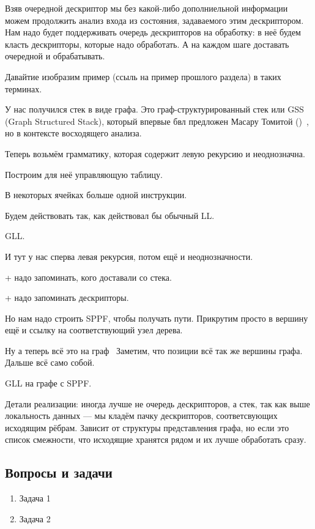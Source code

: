 Взяв очередной дескриптор мы без какой-либо дополниельной информации можем продолжить анализ входа из состояния, задаваемого этим дескриптором.
Нам надо будет поддерживать очередь дескрипторов на обработку: в неё будем класть дескрипторы, которые надо обработать. А на каждом шаге доставать очередной и обрабатывать.

Давайтие изобразим пример (ссыль на пример прошлого раздела) в таких терминах.
\begin{example}
\end{example}

У нас получился стек в виде графа. Это граф-структурированный стек или GSS (Graph Structured Stack), который впервые бвл предложен Масару Томитой ()~\cite{!!!}, но в контексте восходящего анализа.



Теперь возьмём грамматику, которая содержит левую рекурсию и неоднозначна.

Построим для неё управляющую таблицу.


В некоторых ячейках больше одной инструкции.

Будем действовать так, как действовал бы обычный LL.

\begin{example} GLL.

  И тут у нас сперва левая рекурсия, потом ещё и неоднозначности.

  + надо запоминать, кого доставали со стека.

  + надо запоминать дескрипторы.

\end{example}


Но нам надо строить SPPF, чтобы получать пути.
Прикрутим просто в вершину ещё и ссылку на соответствующий узел дерева.

Ну а теперь всё это на граф~\cite{Grigorev:2017:CPQ:3166094.3166104}
Заметим, что позиции всё так же вершины графа.
Дальше всё само собой.

\begin{example} GLL на графе с SPPF.
\end{example}


Детали реализации: иногда лучше не очередь дескрипторов, а стек, так как выше локальность данных --- мы кладём пачку дескрипторов, соответсвующих исходящим рёбрам. Зависит от структуры представления графа, но если это список смежности, что исходящие хранятся рядом и их лучше обработать сразу.

\subsection{Вопросы и задачи}
\begin{enumerate}
  \item Задача 1
  \item Задача 2
\end{enumerate}
